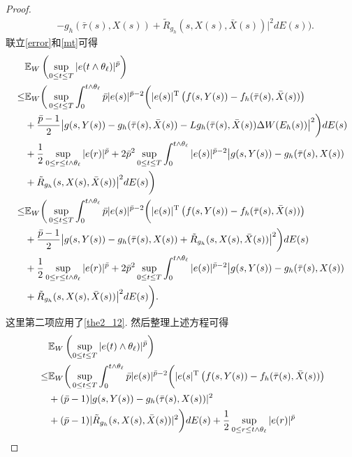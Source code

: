 \begin{proof}
\begin{align}
    &-g_{h}(\bar{\tau}(s),{X}(s))+\tilde{R}_{g_h}(s,X(s),\bar{X}(s))\big|^2dE(s)\bigg).
\end{align}
联立\eqref{error}和\eqref{mt}可得
\begin{align*}
    \label{err226}
    &\mathbb{E}_W\left(\sup_{0\leq t\leq T}|e(t\wedge \theta_{\ell})|^{\bar{p}}\right)\\
    \leq&\mathbb{E}_W\bigg(\sup_{0\leq t\leq T}\int^{t\wedge\theta_{\ell}}_{0}\bar{p}|e(s)|^{\bar{p}-2}\bigg(|e(s)|^{\mathrm{T}}\left(f(s,Y(s))-f_{h}(\bar{\tau}(s),\bar{X}(s))\right)\\
    \quad& +\frac{\bar{p}-1}{2}\big|g(s,Y(s))-g_{h}(\bar{\tau}(s),\bar{X}(s))-Lg_{h}(\bar{\tau}(s),\bar{X}(s))\Delta W(E_h(s))\big|^2 \bigg)dE(s)\\
    \quad&
    +\frac{1}{2}\sup_{0\leq r\leq t\wedge\theta_{\ell}}|e(r)|^{\bar{p}}+2\bar{p}^{2}\sup_{0\leq t\leq T}\int^{t\wedge\theta_{\ell}}_{0}|e(s)|^{\bar{p}-2}\big|g(s,Y(s))-g_{h}(\bar{\tau}(s),X(s))\\
    \quad&
    +\tilde{R}_{g_h}(s,X(s),\bar{X}(s))\big|^2dE(s)\bigg)\\
    \leq&\mathbb{E}_W\bigg(\sup_{0\leq t\leq T}\int^{t\wedge\theta_{\ell}}_{0}\bar{p}|e(s)|^{\bar{p}-2}\bigg(|e(s)|^{\mathrm{T}}\left(f(s,Y(s))-f_{h}(\bar{\tau}(s),\bar{X}(s))\right)\\
    \quad& +\frac{\bar{p}-1}{2}\big|g(s,Y(s))-g_{h}(\bar{\tau}(s),X(s))+\tilde{R}_{g_h}(s,X(s),\bar{X}(s))\big|^2\bigg)dE(s)\\
    \quad&
    +\frac{1}{2}\sup_{0\leq r\leq t\wedge\theta_{\ell}}|e(r)|^{\bar{p}}+2\bar{p}^{2}\sup_{0\leq t\leq T}\int^{t\wedge\theta_{\ell}}_{0}|e(s)|^{\bar{p}-2}\big|g(s,Y(s))-g_{h}(\bar{\tau}(s),X(s))\\
    \quad&
    +\tilde{R}_{g_h}(s,X(s),\bar{X}(s))\big|^2dE(s)\bigg).
\end{align*}
这里第二项应用了\eqref{the2_12}. 然后整理上述方程可得
\begin{align}
    &\EE_W\left(\sup_{0\leq t\leq T}|e(t)\wedge \theta_{\ell})|^{\bar{p}}\right)\nonumber\\
    \leq&\EE_W\bigg(\sup_{0\leq t\leq T}\int^{t\wedge\theta_{\ell}}_{0}\bar{p}|e(s)|^{\bar{p}-2}\bigg(|e(s|^{\mathrm{T}}\left(f(s,Y(s))-f_{h}(\bar{\tau}(s),\bar{X}(s))\right)\nonumber\\
    \quad& +(\bar{p}-1)|g(s,Y(s))-g_{h}(\bar{\tau}(s),X(s))|^{2}\nonumber\\
    \quad &+(\bar{p}-1)
    |\tilde{R}_{g_h}(s,X(s),\bar{X}(s))|^2\bigg)dE(s)+\frac{1}{2}\sup_{0\leq r\leq t\wedge\theta_{\ell}}|e(r)|^{\bar{p}}\nonumber\\

\end{align}
\end{proof}
